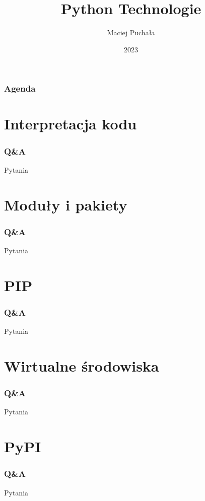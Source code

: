 \documentclass{beamer}
\title{Python Technologie}
\author{Maciej Puchała}
\date{2023}
\begin{document}
	
	\frame{\titlepage}
	
	\begin{frame}
		\frametitle{Agenda}
		\tableofcontents
	\end{frame}
\section{Interpretacja kodu}
\begin{frame}
	\frametitle{Q\&A}
	\begin{center}
		\Huge Pytania
	\end{center}
\end{frame}
\section{Moduły i pakiety}
\begin{frame}
	\frametitle{Q\&A}
	\begin{center}
		\Huge Pytania
	\end{center}
\end{frame}
\section{PIP}
\begin{frame}
	\frametitle{Q\&A}
	\begin{center}
		\Huge Pytania
	\end{center}
\end{frame}
\section{Wirtualne środowiska}
\begin{frame}
	\frametitle{Q\&A}
	\begin{center}
		\Huge Pytania
	\end{center}
\end{frame}
\section{PyPI}
\begin{frame}
	\frametitle{Q\&A}
	\begin{center}
		\Huge Pytania
	\end{center}
\end{frame}
\frame{}
	
\end{document}
